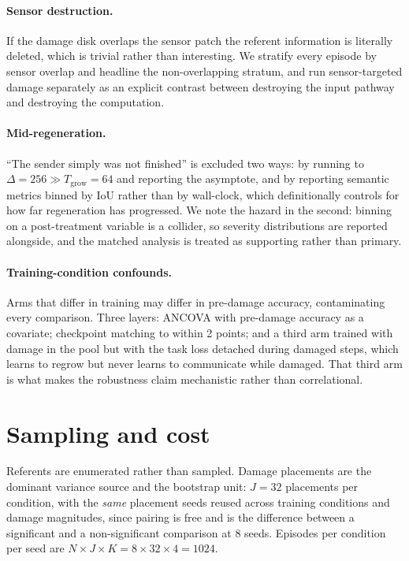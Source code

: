 \paragraph{Sensor destruction.} If the damage disk overlaps the sensor patch the
referent information is literally deleted, which is trivial rather than
interesting. We stratify every episode by sensor overlap and headline the
non-overlapping stratum, and run sensor-targeted damage separately as an explicit
contrast between destroying the input pathway and destroying the computation.

\paragraph{Mid-regeneration.} ``The sender simply was not finished'' is excluded
two ways: by running to $\Delta = 256 \gg T_{\mathrm{grow}} = 64$ and reporting
the asymptote, and by reporting semantic metrics binned by IoU rather than by
wall-clock, which definitionally controls for how far regeneration has
progressed. We note the hazard in the second: binning on a post-treatment
variable is a collider, so severity distributions are reported alongside, and the
matched analysis is treated as supporting rather than primary.

\paragraph{Training-condition confounds.} Arms that differ in training may differ
in pre-damage accuracy, contaminating every comparison. Three layers: ANCOVA with
pre-damage accuracy as a covariate; checkpoint matching to within 2 points; and a
third arm trained with damage in the pool but with the task loss detached during
damaged steps, which learns to regrow but never learns to communicate while
damaged. That third arm is what makes the robustness claim mechanistic rather
than correlational.

\section{Sampling and cost}
\label{app:sampling}

Referents are enumerated rather than sampled. Damage placements are the dominant
variance source and the bootstrap unit: $J = 32$ placements per condition, with
the \emph{same} placement seeds reused across training conditions and damage
magnitudes, since pairing is free and is the difference between a significant and
a non-significant comparison at 8 seeds. Episodes per condition per seed are
$N \times J \times K = 8 \times 32 \times 4 = 1024$.

